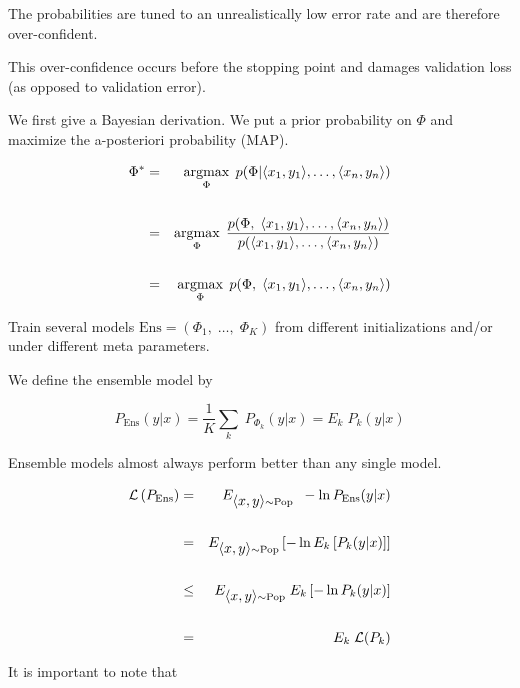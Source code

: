 {\vfill
The probabilities are tuned to an unrealistically low error rate and are therefore over-confident.

\vfill
This over-confidence occurs before the stopping point and damages validation loss (as opposed to validation error).


We first give a Bayesian derivation. We put a prior probability on $\Phi$ and maximize the a-posteriori probability (MAP).

\vfill
{\huge
\begin{eqnarray*}
\Phi^* & = & \operatorname*{argmax}_\Phi\;p(\Phi | {\mbox{$\langle x_1,y_1\rangle$}},\ldots,{\mbox{$\langle x_n,y_n\rangle$}}) \\
\\
 & = & \operatorname*{argmax}_\Phi\;\frac{p(\Phi,\; {\mbox{$\langle x_1,y_1\rangle$}},\ldots,{\mbox{$\langle x_n,y_n\rangle$}})}{p({\mbox{$\langle x_1,y_1\rangle$}},\ldots,{\mbox{$\langle x_n,y_n\rangle$}})} \\
\\
 & = & \operatorname*{argmax}_\Phi\;p(\Phi,\;{\mbox{$\langle x_1,y_1\rangle$}},\ldots,{\mbox{$\langle x_n,y_n\rangle$}})
 \end{eqnarray*}
}


Train several models $\mathrm{Ens} = (\Phi_1,\;\ldots,\; \Phi_K)$ from different initializations and/or under different meta parameters.

\vfill
We define the ensemble model by

$$P_\mathrm{Ens}(y|x) = \frac{1}{K} \sum_k\; P_{\Phi_k}(y|x) = E_k \;P_k(y|x)$$

\vfill
Ensemble models almost always perform better than any single model.

\vfill
{}

\begin{eqnarray*}
{\cal L}\left(P_\mathrm{Ens}\right) & = & E_{{\mbox{$\langle x,y\rangle$}} \sim \mathrm{Pop}}\;\;-\ln P_\mathrm{Ens}(y|x) \\
\\
 & = & E_{{\mbox{$\langle x,y\rangle$}} \sim \mathrm{Pop}}\left[-\ln E_k\left[ P_k(y|x)\right]\right] \\
\\
& \leq & E_{{\mbox{$\langle x,y\rangle$}} \sim \mathrm{Pop}} \;E_k\left[-\ln P_k(y|x)\right] \\
\\
& = & E_k\; {\cal L}(P_k)
\end{eqnarray*}


It is important to note that

}
